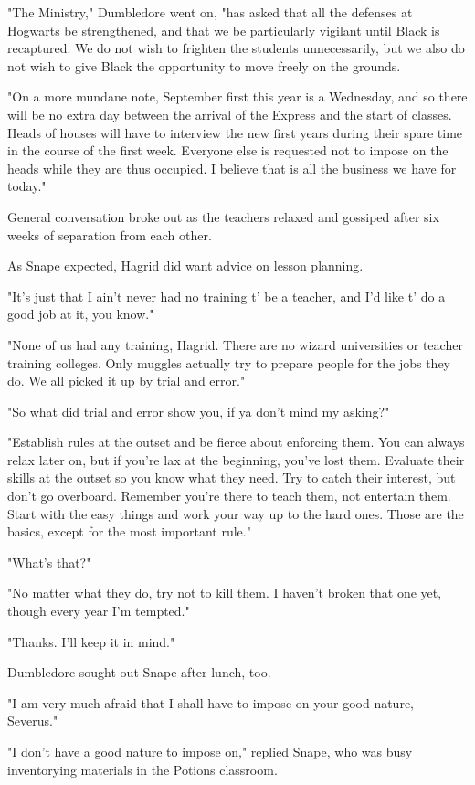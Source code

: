 "The Ministry," Dumbledore went on, "has asked that all the defenses at Hogwarts be strengthened, and that we be particularly vigilant until Black is recaptured. We do not wish to frighten the students unnecessarily, but we also do not wish to give Black the opportunity to move freely on the grounds.

"On a more mundane note, September first this year is a Wednesday, and so there will be no extra day between the arrival of the Express and the start of classes. Heads of houses will have to interview the new first years during their spare time in the course of the first week. Everyone else is requested not to impose on the heads while they are thus occupied. I believe that is all the business we have for today."

General conversation broke out as the teachers relaxed and gossiped after six weeks of separation from each other.

As Snape expected, Hagrid did want advice on lesson planning.

"It's just that I ain't never had no training t' be a teacher, and I'd like t' do a good job at it, you know."

"None of us had any training, Hagrid. There are no wizard universities or teacher training colleges. Only muggles actually try to prepare people for the jobs they do. We all picked it up by trial and error."

"So what did trial and error show you, if ya don't mind my asking?"

"Establish rules at the outset and be fierce about enforcing them. You can always relax later on, but if you're lax at the beginning, you've lost them. Evaluate their skills at the outset so you know what they need. Try to catch their interest, but don't go overboard. Remember you're there to teach them, not entertain them. Start with the easy things and work your way up to the hard ones. Those are the basics, except for the most important rule."

"What's that?"

"No matter what they do, try not to kill them. I haven't broken that one yet, though every year I'm tempted."

"Thanks. I'll keep it in mind."

Dumbledore sought out Snape after lunch, too.

"I am very much afraid that I shall have to impose on your good nature, Severus."

"I don't have a good nature to impose on," replied Snape, who was busy inventorying materials in the Potions classroom.

